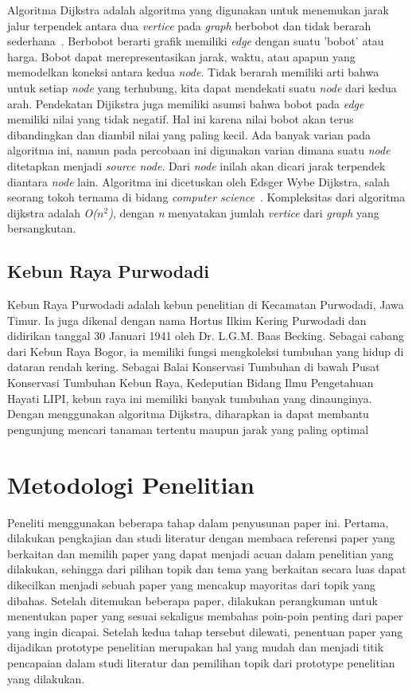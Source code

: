 \documentclass[conference]{IEEEtran}
\begin{document}
Algoritma Dijkstra adalah algoritma yang digunakan untuk menemukan jarak jalur terpendek antara dua  \textit{vertice} pada  \textit{graph} berbobot dan tidak berarah sederhana~\cite{Rosen2011}. Berbobot berarti graﬁk memiliki  \textit{edge} dengan suatu ’bobot’ atau harga. Bobot dapat merepresentasikan jarak, waktu, atau apapun yang memodelkan koneksi antara kedua  \textit{node}. Tidak berarah memiliki arti bahwa untuk setiap  \textit{node} yang terhubung, kita dapat mendekati suatu  \textit{node} dari kedua arah. Pendekatan Dijikstra juga memiliki asumsi bahwa bobot pada  \textit{edge} memiliki nilai yang tidak negatif. Hal ini karena nilai bobot akan terus dibandingkan dan diambil nilai yang paling kecil. Ada banyak varian pada algoritma ini, namun pada percobaan ini digunakan varian dimana suatu  \textit{node} ditetapkan menjadi  \textit{source node}. Dari  \textit{node} inilah akan dicari jarak terpendek diantara  \textit{node} lain. Algoritma ini dicetuskan oleh Edsger Wybe Dijkstra, salah seorang tokoh ternama di bidang  \textit{computer science}~\cite{dijkstra1959note}. Kompleksitas dari algoritma dijkstra adalah  \textit{O($n^2$)}, dengan \textit{n} menyatakan jumlah  \textit{vertice} dari  \textit{graph} yang bersangkutan.

\subsection{Kebun Raya Purwodadi}
Kebun Raya Purwodadi adalah kebun penelitian di Kecamatan Purwodadi, Jawa Timur. Ia juga dikenal dengan nama Hortus Ilkim Kering Purwodadi dan didirikan tanggal 30 Januari 1941 oleh Dr. L.G.M. Baas Becking. Sebagai cabang dari Kebun Raya Bogor, ia memiliki fungsi mengkoleksi tumbuhan yang hidup di dataran rendah kering. Sebagai Balai Konservasi Tumbuhan di bawah Pusat Konservasi Tumbuhan Kebun Raya, Kedeputian Bidang Ilmu Pengetahuan Hayati LIPI, kebun raya ini memiliki banyak tumbuhan yang dinaunginya. Dengan menggunakan algoritma Dijkstra, diharapkan ia dapat membantu pengunjung mencari tanaman tertentu maupun jarak yang paling optimal

\section{Metodologi Penelitian}
Peneliti menggunakan beberapa tahap dalam penyusunan paper ini. Pertama, dilakukan pengkajian dan studi literatur dengan membaca referensi paper yang berkaitan dan memilih paper yang dapat menjadi acuan dalam penelitian yang dilakukan, sehingga dari pilihan topik dan tema yang berkaitan secara luas dapat dikecilkan menjadi sebuah paper yang mencakup mayoritas dari topik yang dibahas. Setelah ditemukan beberapa paper, dilakukan perangkuman untuk menentukan paper yang sesuai sekaligus membahas poin-poin penting dari paper yang ingin dicapai. Setelah kedua tahap tersebut dilewati, penentuan paper yang dijadikan prototype penelitian merupakan hal yang mudah dan menjadi titik pencapaian dalam studi literatur dan pemilihan topik dari prototype penelitian yang dilakukan.
\end{document}
